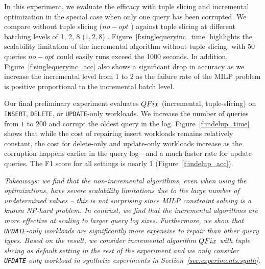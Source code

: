 In this experiment, we evaluate the efficacy \sys with tuple slicing and incremental optimization
in the special case when only one query has been corrupted. We compare 
\incremental without tuple slicing ($no-opt$ ) against tuple slicing at 
different batching levels of 1, 2, 8 ($1,2,8$) . 
Figure~\ref{f:singlequeryinc_time} highlights the scalability limitation of the incremental 
algorithm without tuple slicing: with 50 queries $no-opt$ could easily runs exceed the 1000 seconds.   
In addition, Figure~\ref{f:singlequeryinc_acc} also shows a significant drop in accuracy as we increase the incremental level  from $1$ 
to $2$ as the failure rate of the MILP problem is positive proportional to the incremental batch level.


\label{sec:indelup}
Our final preliminary experiment evaluates 
$QFix$ (incremental, tuple-slicing) on \texttt{INSERT}, \texttt{DELETE}, or \texttt{UPDATE}-only workloads.
We increase the number of queries from $1$ to $200$ and corrupt the oldest query in the log.  
Figure~\ref{f:indelup_time} shows that while the cost of repairing insert workloads
remains relatively constant, the cost for delete-only and update-only workloads increase as 
the corruption happens earlier in the query log---and a much faster rate for update queries.
The F1 score for all settings is nearly 1 (Figure~\ref{f:indelup_acc}).


{\it Takeaways: we find that the non-incremental \sys algorithms, even when using the optimizations,
have severe scalability limitations due to the large number of undetermined values -- this is not surprising
since MILP constraint solving is a known NP-hard problem.
In contrast, we find that the incremental algorithms  are more effective at scaling to larger query log sizes.  
Furthermore, we show that \texttt{UPDATE}-only workloads are significantly more expensive to repair than other 
query types. Based on the result, we consider incremental
algorithm $QFix$ with tuple slicing as default setting in the rest of the experiment and we only consider \texttt{UPDATE}-only workload in synthetic experiments in Section~\ref{sec:experiments:synth}. 
}

